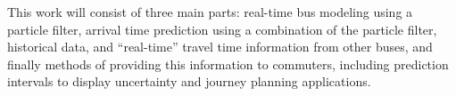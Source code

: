 \documentclass[12pt,a4paper]{article}
\begin{document}




















This work will consist of three main parts:
real-time bus modeling using a particle filter,
arrival time prediction using a combination of the particle filter,
historical data, and ``real-time'' travel time information
from other buses,
and finally methods of providing this information to commuters,
including prediction intervals
to display uncertainty and journey planning applications.
\end{document}
